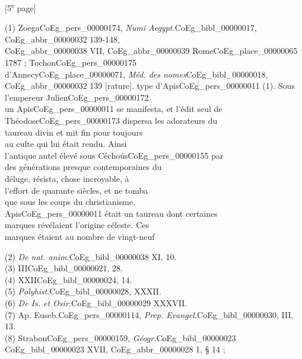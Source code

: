 \documentclass{book}
\begin{document}
{{\footnotesize\begin{center} {[5\textsuperscript{e} page]}\end{center}}
\begin{paracol}{2}
\noindent (1) Zoega\gls{CoEg_pers_00000174}, \textit{Numi Aegypt.}\gls{CoEg_bibl_00000017}, \gls{CoEg_abbr_00000032} 139-148,\\
\gls{CoEg_abbr_00000038} VII, \gls{CoEg_abbr_00000039} Rome\gls{CoEg_place_00000065} 1787 ; Tochon\gls{CoEg_pers_00000175}\\
d’Annecy\gls{CoEg_place_00000071}, \textit{Méd. des nomes}\gls{CoEg_bibl_00000018}, \gls{CoEg_abbr_00000032} 139 [rature].
\switchcolumn
\noindent type d’Apis\gls{CoEg_pers_00000011} (1). Sous l’empereur Julien\gls{CoEg_pers_00000172}\\
un Apis\gls{CoEg_pers_00000011} se manifesta, et l’édit seul de\\
Théodose\gls{CoEg_pers_00000173} dispersa les adorateurs du\\
taureau divin et mit fin pour toujours\\
au culte qui lui était rendu. Ainsi\\
l’antique autel élevé sous Céchoüs\gls{CoEg_pers_00000155} par\\
des générations presque contemporaines du\\
déluge, résista, chose incroyable, à\\
l’effort de quarante siècles, et ne tomba\\
que sous les coups du christianisme.\\
\noindent Apis\gls{CoEg_pers_00000011} était un taureau dont certaines\\
marques révélaient l’origine céleste. Ces\\
marques étaient au nombre de vingt-neuf
\end{paracol}
\begin{paracol}{2}
\noindent (2) \textit{De nat. anim.}\gls{CoEg_bibl_00000038} XI, 10.\\
(3) III\gls{CoEg_bibl_00000021}, 28.\\
(4) XXII\gls{CoEg_bibl_00000024}, 14.\\
(5) \textit{Polyhist}.\gls{CoEg_bibl_00000028}, XXXII.\\
(6) \textit{De Is. et Osir.}\gls{CoEg_bibl_00000029} XXXVII.\\
(7) Ap. Euseb.\gls{CoEg_pers_00000114}, \textit{Prep. Evangel.}\gls{CoEg_bibl_00000030}, III, 13.\\
(8) Strabon\gls{CoEg_pers_00000159}, \textit{Géogr.}\gls{CoEg_bibl_00000023} \gls{CoEg_bibl_00000023} XVII, \gls{CoEg_abbr_00000028} 1, § 14 ;\\

\end{paracol}}
\end{document}

